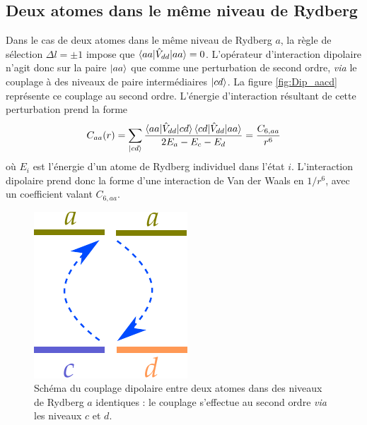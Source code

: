 \subsection{Deux atomes dans le même niveau de Rydberg}
Dans le cas de deux atomes dans le même niveau de Rydberg $a$, la règle de sélection $\Delta l = \pm 1$ impose que $\braket{aa|\hat{V}_{dd}|aa} = 0$.
L'opérateur d'interaction dipolaire n'agit donc sur la paire $\ket{aa}$ que comme une perturbation de second ordre, \textit{via} le couplage à des niveaux de paire intermédiaires $\ket{cd}$.
La figure \eqref{fig:Dip_aacd} représente ce couplage au second ordre.
L'énergie d'interaction résultant de cette perturbation prend la forme
\begin{equation}\label{eq:VdW_aacd}
C_{aa}(r)=\sum_{\ket{cd}}{\frac{\braket{aa|\hat{V}_{dd}|cd}\braket{cd|\hat{V}_{dd}|aa}}{2E_a - E_c - E_d}}  = \frac{C_{6,aa}}{r^6}
\end{equation}
où $E_i$ est l'énergie d'un atome de Rydberg individuel dans l'état $i$.
L'interaction dipolaire prend donc la forme d'une interaction de Van der Waals en $1/r^6$, avec un coefficient valant $C_{6,aa}$.

\begin{figure}[!h]
\centering

\includegraphics[width=0.3\linewidth]{figures/theory/dipole_coupling_aacd}
\caption[Couplage dipolaire entre mêmes niveaux de Rydberg]{Schéma du couplage dipolaire entre deux atomes dans des niveaux de Rydberg $a$ identiques : le couplage s'effectue au second ordre \textit{via} les niveaux $c$ et $d$.}
\label{fig:Dip_aacd}
\end{figure}

